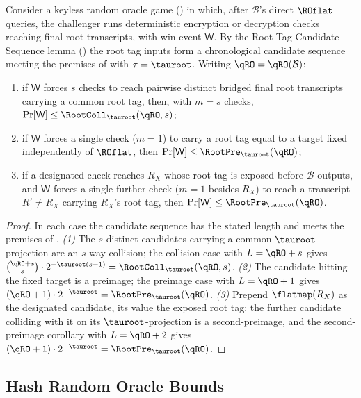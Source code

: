 \begin{lemma}
\label{lem:root-tag-hash}
Consider a keyless \TW{} random oracle game () in
which, after $\mathcal{B}$'s direct $\ROflat$ queries, the challenger runs
deterministic encryption or decryption checks reaching final root
transcripts, with win event $\mathsf{W}$. By the Root Tag Candidate
Sequence lemma () the root tag inputs form a
chronological candidate sequence meeting the premises of
 with $\tau = \tauroot$. Writing
$\qRO = \qRO(\mathcal{B})$:
\begin{enumerate}
\item if $\mathsf{W}$ forces $s$ checks to reach pairwise distinct bridged
  final root transcripts carrying a common root tag, then, with $m = s$
  checks, $\Pr[\mathsf{W}] \leq \RootColl_{\tauroot}(\qRO, s)$;
\item if $\mathsf{W}$ forces a single check ($m = 1$) to carry a root tag
  equal to a target fixed independently of $\ROflat$, then
  $\Pr[\mathsf{W}] \leq \RootPre_{\tauroot}(\qRO)$;
\item if a designated check reaches $R_X$ whose root tag is exposed before
  $\mathcal{B}$ outputs, and $\mathsf{W}$ forces a single further check
  ($m = 1$ besides $R_X$) to reach a transcript $R' \neq R_X$ carrying
  $R_X$'s root tag, then $\Pr[\mathsf{W}] \leq \RootPre_{\tauroot}(\qRO)$.
\end{enumerate}
\end{lemma}

\begin{proof}
In each case the candidate sequence has the stated length and meets the
premises of .
\emph{(1)} The $s$ distinct candidates carrying a common
$\tauroot$-projection are an $s$-way collision; the collision case with
$L = \qRO + s$ gives
$\binom{\qRO + s}{s} \cdot 2^{-\tauroot(s-1)}
= \RootColl_{\tauroot}(\qRO, s)$.
\emph{(2)} The candidate hitting the fixed target is a preimage; the
preimage case with $L = \qRO + 1$ gives
$(\qRO + 1) \cdot 2^{-\tauroot} = \RootPre_{\tauroot}(\qRO)$.
\emph{(3)} Prepend $\flatmap(R_X)$ as the designated candidate, its value
the exposed root tag; the further candidate colliding with it on its
$\tauroot$-projection is a second-preimage, and the second-preimage
corollary with $L = \qRO + 2$ gives
$(\qRO + 1) \cdot 2^{-\tauroot} = \RootPre_{\tauroot}(\qRO)$.
\end{proof}

\subsection{Hash Random Oracle Bounds}

